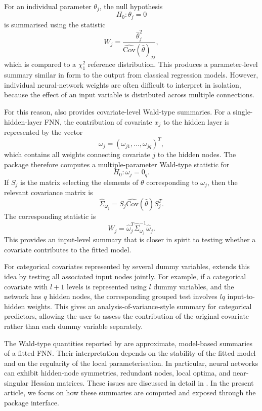 For an individual parameter \(\theta_j\), the null hypothesis
\[
    H_0: \theta_j = 0
\]
is summarised using the statistic
\[
    W_j = \frac{\hat{\theta}_j^2}{\widehat{\mathrm{Cov}}(\hat{\theta})_{jj}},
\]
which is compared to a \(\chi^2_1\) reference distribution.
This produces a parameter-level summary similar in form to the output from classical regression models.
However, individual neural-network weights are often difficult to interpret in isolation, because the effect of an input variable is distributed across multiple connections.

For this reason,  also provides covariate-level Wald-type summaries.
For a single-hidden-layer FNN, the contribution of covariate \(x_j\) to the hidden layer is represented by the vector
\[
    \omega_j = (\omega_{j1}, \dots, \omega_{jq})^T,
\]
which contains all weights connecting covariate \(j\) to the hidden nodes.
The package therefore computes a multiple-parameter Wald-type statistic for
\[
    H_0: \omega_j = 0_q.
\]
If \(S_j\) is the matrix selecting the elements of \(\theta\) corresponding to \(\omega_j\), then the relevant covariance matrix is
\[
    \widehat{\Sigma}_{\omega_j}
    =
    S_j \widehat{\mathrm{Cov}}(\hat{\theta}) S_j^T.
\]
The corresponding statistic is
\[
    W_j =
    \hat{\omega}_j^T
    \widehat{\Sigma}_{\omega_j}^{-1}
    \hat{\omega}_j.
\]
This provides an input-level summary that is closer in spirit to testing whether a covariate contributes to the fitted model.

For categorical covariates represented by several dummy variables,  extends this idea by testing all associated input nodes jointly.
For example, if a categorical covariate with \(l+1\) levels is represented using \(l\) dummy variables, and the network has \(q\) hidden nodes, the corresponding grouped test involves \(lq\) input-to-hidden weights.
This gives an analysis-of-variance-style summary for categorical predictors, allowing the user to assess the contribution of the original covariate rather than each dummy variable separately.

The Wald-type quantities reported by  are approximate, model-based summaries of a fitted FNN.
Their interpretation depends on the stability of the fitted model and on the regularity of the local parameterisation.
In particular, neural networks can exhibit hidden-node symmetries, redundant nodes, local optima, and near-singular Hessian matrices.
These issues are discussed in detail in \citet{mcinerney2023feedforward}.
In the present article, we focus on how these summaries are computed and exposed through the package interface.

